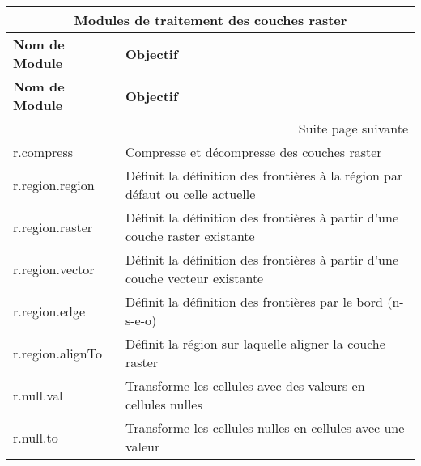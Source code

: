 \begin{center}
{\setlength{\extrarowheight}{10pt}
\small
\begin{longtable}{|p{2.5cm}|p{11.5cm}|}
  \hline \multicolumn{2}{|c|}{\textbf{Modules de traitement des couches raster}} \\
\hline \textbf{Nom de Module}&\textbf{Objectif}\\
\endfirsthead
\hline \textbf{Nom de Module}&\textbf{Objectif}\\
\endhead
\hline \multicolumn{2}{|r|}{{Suite page suivante}} \\ \hline
\endfoot
\endlastfoot
  \hline r.compress & Compresse et décompresse des couches raster \\
  \hline r.region.region & Définit la définition des frontières à la région par défaut ou celle actuelle \\
  \hline r.region.raster & Définit la définition des frontières à partir d'une couche raster existante \\
  \hline r.region.vector & Définit la définition des frontières à partir d'une couche vecteur existante \\
  \hline r.region.edge & Définit la définition des frontières par le bord (n-s-e-o) \\
  \hline r.region.alignTo & Définit la région sur laquelle aligner la couche raster \\
  \hline r.null.val & Transforme les cellules avec des valeurs en cellules nulles\\
  \hline r.null.to & Transforme les cellules nulles en cellules avec une valeur\\

\end{longtable}}
\end{center}
